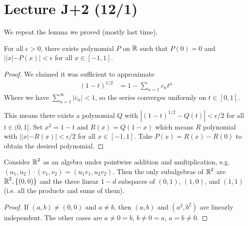 \section{Lecture J+2 (12/1)}

We repeat the lemma we proved (mostly last time).

\begin{theorem}
    For all $\epsilon > 0$, there exists polynomial $P$ on $\operatorname{\mathbb{R}}$ such that
    $P(0) = 0$ and $||x| - P(x)| < \epsilon$ for all $x \in [-1, 1]$.
    \begin{proof}
        We claimed it was sufficient to approximate
        \begin{align*}
            (1-t)^{1/2} &= 1 - \sum_{n = 1} c_n t^n
        \end{align*}
        Where we have $\sum_{n = 1}^{\infty} |c_n| < 1$, so the series converges uniformly on $t \in [0, 1]$.

        This means there exists a polynomial $Q$ with $|(1 - t)^{1/2} - Q(t)| < \epsilon/2$
        for all $t \in (0, 1]$. Set $x^2 = 1 - t$
        and $R(x) = Q(1 - x)$ which means $R$ polynomial with
        $||x| - R(x)|< \epsilon/2$ for all $x \in [-1, 1]$.
        Take $P(x) = R(x) - R(0)$ to obtain the desired polynomial.
    \end{proof}
\end{theorem}

\begin{theorem}
    Consider $\operatorname{\mathbb{R}}^2$ as an algebra under pointwise addition and multiplication, e.g. $(u_1, u_2) \cdot (v_1, v_2) = (u_1 v_1, u_2 v_2)$.
    Then the only subalgebras of $\operatorname{\mathbb{R}}^2$ are $\operatorname{\mathbb{R}}^2, \{(0,0)\}$ and
    the three linear $1-d$ subspaces of $(0, 1)$, $(1, 0)$, and $(1, 1)$ (i.e. 
    all the products and sums of them).
    \begin{proof}
        If $(a, b) \neq (0, 0)$ and $a\neq b$, then $(a, b)$ and $(a^2, b^2)$
        are linearly independent. The other cases are $a \neq 0 = b$, $b \neq 0 = a$, $a = b \neq 0$.
    \end{proof}
\end{theorem}

